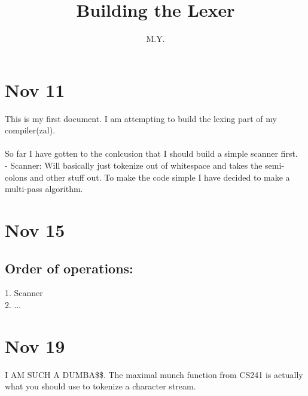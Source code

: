 \documentclass{article}
\begin{document}
\title{Building the Lexer}
\author{M.Y.}

\maketitle

\section*{Nov 11}

This is my first document. I am attempting to build  the
lexing part of my compiler(zal).
\\\\
So far I have gotten to the conlcusion that I should
build a simple scanner first.
\\
- Scanner: Will basically just tokenize out of whitespace
    and takes the semi-colons and other stuff out. To make the
    code simple I have decided to make a multi-pass algorithm.

\section*{Nov 15}
\subsection*{Order of operations:}
1. Scanner \\
2. ...

\section*{Nov 19}
I AM SUCH A DUMBA\$\$. The maximal munch function from CS241 is actually what you should
use to tokenize a character stream.
\end{document}

